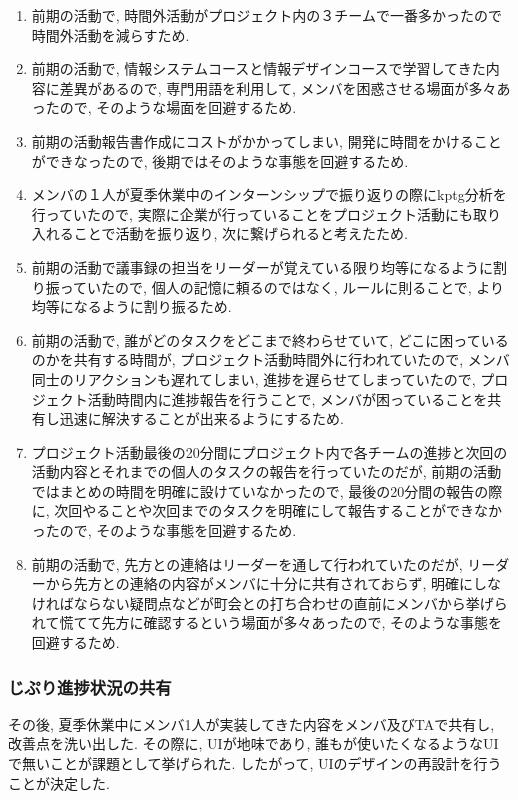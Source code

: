 \begin{enumerate}
    \item 前期の活動で, 時間外活動がプロジェクト内の３チームで一番多かったので時間外活動を減らすため.
    \item 前期の活動で, 情報システムコースと情報デザインコースで学習してきた内容に差異があるので, 専門用語を利用して, メンバを困惑させる場面が多々あったので, そのような場面を回避するため.
    \item 前期の活動報告書作成にコストがかかってしまい, 開発に時間をかけることができなったので, 後期ではそのような事態を回避するため.
    \item メンバの１人が夏季休業中のインターンシップで振り返りの際にkptg分析を行っていたので, 実際に企業が行っていることをプロジェクト活動にも取り入れることで活動を振り返り, 次に繋げられると考えたため.
    \item 前期の活動で議事録の担当をリーダーが覚えている限り均等になるように割り振っていたので, 個人の記憶に頼るのではなく, ルールに則ることで, より均等になるように割り振るため.
    \item 前期の活動で, 誰がどのタスクをどこまで終わらせていて, どこに困っているのかを共有する時間が, プロジェクト活動時間外に行われていたので, メンバ同士のリアクションも遅れてしまい, 進捗を遅らせてしまっていたので,
          プロジェクト活動時間内に進捗報告を行うことで, メンバが困っていることを共有し迅速に解決することが出来るようにするため.
    \item プロジェクト活動最後の20分間にプロジェクト内で各チームの進捗と次回の活動内容とそれまでの個人のタスクの報告を行っていたのだが, 前期の活動ではまとめの時間を明確に設けていなかったので,
          最後の20分間の報告の際に, 次回やることや次回までのタスクを明確にして報告することができなかったので, そのような事態を回避するため.
    \item 前期の活動で, 先方との連絡はリーダーを通して行われていたのだが, リーダーから先方との連絡の内容がメンバに十分に共有されておらず,
          明確にしなければならない疑問点などが町会との打ち合わせの直前にメンバから挙げられて慌てて先方に確認するという場面が多々あったので, そのような事態を回避するため.
\end{enumerate}

\subsubsection{じぷり進捗状況の共有}
その後, 夏季休業中にメンバ1人が実装してきた内容をメンバ及びTAで共有し, 改善点を洗い出した.
その際に, UIが地味であり, 誰もが使いたくなるようなUIで無いことが課題として挙げられた. したがって, UIのデザインの再設計を行うことが決定した.


